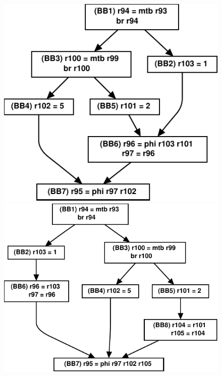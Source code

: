\begin{figure}[th]
\begin{minipage}[b]{3cm}
\includegraphics[scale=0.3]{g1.pdf}
\end{minipage}
\begin{minipage}[b]{3cm}
\includegraphics[scale=0.3]{g2.pdf}
\end{minipage}
\begin{minipage}[b]{3cm}

\end{minipage}
\end{figure}
